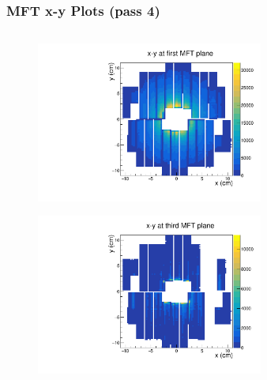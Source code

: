 \documentclass[10pt]{beamer}
\begin{document}
\begin{frame}
    \frametitle{MFT x-y Plots (pass 4)}

    \begin{columns}[T]
        \begin{column}{0.5\textwidth}
            \vspace*{-0.5cm}
            \begin{figure}
                \begin{center}
                    \includegraphics[width=0.7\textwidth]{Plots/pass4_MFT/x_y_1_pass4.pdf}
                \end{center}
            \end{figure}
            \vspace*{-0.7cm}
            \begin{figure}
                \begin{center}
                    \includegraphics[width=0.7\textwidth]{Plots/pass4_MFT/x_y_3_pass4.pdf}
                \end{center}
            \end{figure}
        \end{column}
        \begin{column}{0.5\textwidth}
            \vspace*{-0.5cm}

\end{column}
\end{columns}
\end{frame}
\end{document}
